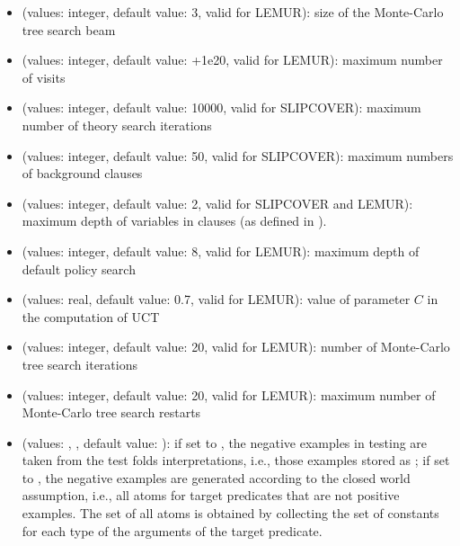\documentclass[letterpaper,10pt,english]{sphinxmanual}
\begin{document}
\begin{itemize}
\item {} 
 (values: integer, default value: 3, valid for LEMUR): size of the Monte-Carlo tree search beam

\item {} 
 (values: integer, default value: +1e20, valid for LEMUR): maximum number of visits

\item {} 
 (values: integer, default value: 10000, valid for SLIPCOVER): maximum number of theory search iterations

\item {} 
 (values: integer, default value: 50, valid for SLIPCOVER): maximum numbers of background clauses

\item {} 
 (values: integer, default value: 2, valid for SLIPCOVER and LEMUR): maximum depth of variables in clauses (as defined in ).

\item {} 
 (values: integer, default value: 8, valid for LEMUR): maximum depth of default policy search

\item {} 
 (values: real, default value: 0.7, valid for LEMUR): value of parameter \(C\) in the computation of UCT

\item {} 
 (values: integer, default value: 20, valid for LEMUR): number of Monte-Carlo tree search iterations

\item {} 
 (values: integer, default value: 20, valid for LEMUR): maximum number of Monte-Carlo tree search restarts

\item {} 
 (values: , , default value: ): if set to , the negative examples in testing are taken from the test folds interpretations, i.e., those examples  stored as ; if set to , the negative examples are generated according to the closed world assumption, i.e., all atoms for target predicates that are not positive examples. The set of all atoms is obtained by collecting the set of constants for each type of the arguments of the target predicate.


\end{itemize}
\end{document}
